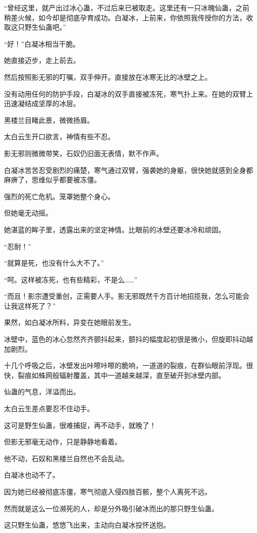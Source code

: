 \begin{this_body}
“曾经这里，就产出过冰心蛊，不过后来已被取走。这里还有一只冰魄仙蛊，之前稍差火候，如今却是彻底孕育成功。白凝冰，上前来，你依照我传授你的方法，收取这只野生仙蛊吧。”

“好！”白凝冰相当干脆。

她直接迈步，走上前去。

然后按照影无邪的叮嘱，双手伸开。直接放在冰寒无比的冰壁之上。

没有动用任何的防护手段，白凝冰的双手直接被冻死，寒气扑上来。在她的双臂上迅速凝结成坚厚的冰层。

黑楼兰目睹此景，微微扬眉。

太白云生开口欲言，神情有些不忍。

影无邪则微微带笑，石奴仍旧面无表情，默不作声。

白凝冰苦苦忍受剧烈的痛楚，寒气通过双臂，强袭她的身躯，很快她就感到全身都麻痹了，思维似乎都要被冻僵。

强烈的死亡危机。笼罩她整个身心。

但她毫无动摇。

她湛蓝的眸子里，透露出来的坚定神情。比眼前的冰壁还要冰冷和顽固。

“忍耐！”

“就算是死，也没有什么大不了。”

“呵。这样被冻死，也有些精彩，不是么……”

“而且！影宗遭受重创，正需要人手。影无邪既然千方百计地招揽我，怎么可能会让我这样死了？”

果然，如白凝冰所料，异变在她眼前发生。

冰壁中，蓝色的冰心忽然齐齐颤抖起来，颤抖的幅度起初很是微小，但旋即抖动越加剧烈。

十几个呼吸之后，冰壁发出咔嚓咔嚓的脆响，一道道的裂痕，在群仙眼前浮现。很快，裂痕如蛛网般辐射覆盖，其中一道越来越深，直至破开到冰壁内部。

仙蛊的气息，洋溢而出。

太白云生差点要忍不住动手。

这可是野生仙蛊，很难捕捉，再不动手，就晚了！

但影无邪毫无动作，只是静静地看着。

他不动，石奴和黑楼兰自然也不会乱动。

白凝冰也动不了。

因为她已经被彻底冻僵，寒气彻底入侵四肢百骸，整个人离死不远。

然而就是这么一位濒死的人，却是分外吸引破冰而出的那只野生仙蛊。

这只野生仙蛊，悠悠飞出来，主动向白凝冰投怀送抱。


\end{this_body}
